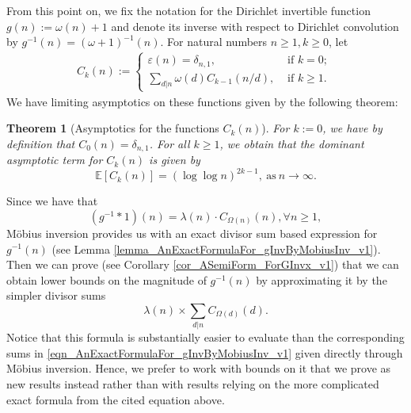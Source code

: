 \documentclass[11pt,reqno,a4letter]{article}
\numberwithin{figure}{section}
\numberwithin{table}{section}
\theoremstyle{plain}
\newtheorem{theorem}{Theorem}
\numberwithin{theorem}{section}
\theoremstyle{definition}
\begin{document}
From this point on, we fix the notation for the Dirichlet invertible function $g(n) := \omega(n) + 1$ and denote its 
inverse with respect to Dirichlet convolution by $g^{-1}(n) = (\omega+1)^{-1}(n)$. 
For natural numbers $n \geq 1, k \geq 0$, let 
\begin{align*} 
C_k(n) := \begin{cases} 
     \varepsilon(n) = \delta_{n,1}, & \text{ if $k = 0$; } \\ 
     \sum\limits_{d|n} \omega(d) C_{k-1}(n/d), & \text{ if $k \geq 1$. } 
     \end{cases} 
\end{align*} 
We have limiting asymptotics on these functions given by the following theorem: 
\begin{theorem}[Asymptotics for the functions $C_k(n)$] 
\label{theorem_Ckn_GeneralAsymptoticsForms} 
For $k := 0$, we have by definition that $C_0(n) = \delta_{n,1}$. 
For all $k \geq 1$, we obtain that the dominant asymptotic term for 
$C_k(n)$ is given by 
\[
\mathbb{E}[C_k(n)] = (\log\log n)^{2k-1}, \mathrm{\ as\ }n \rightarrow \infty. 
\]
\end{theorem} 

Since we have that 
\begin{equation} 
\label{eqn_AnExactFormulaFor_gInvByMobiusInv_v1} 
(g^{-1} \ast 1)(n) = \lambda(n) \cdot C_{\Omega(n)}(n), \forall n \geq 1, 
\end{equation} 
M\"{o}bius inversion provides us with an exact divisor sum based expression for $g^{-1}(n)$ 
(see Lemma \ref{lemma_AnExactFormulaFor_gInvByMobiusInv_v1}). 
Then we can prove (see Corollary \ref{cor_ASemiForm_ForGInvx_v1}) that we can obtain lower bounds on 
the magnitude of $g^{-1}(n)$ by approximating it by the simpler divisor sums 
\[
\lambda(n) \times \sum_{d|n} C_{\Omega(d)}(d). 
\]
Notice that this formula is substantially easier to evaluate than the corresponding sums in 
\eqref{eqn_AnExactFormulaFor_gInvByMobiusInv_v1} given directly through M\"obius inversion. Hence, 
we prefer to work with bounds on it that we prove as new results instead rather than with 
results relying on the more complicated exact formula from the cited equation above. 
\end{document}
